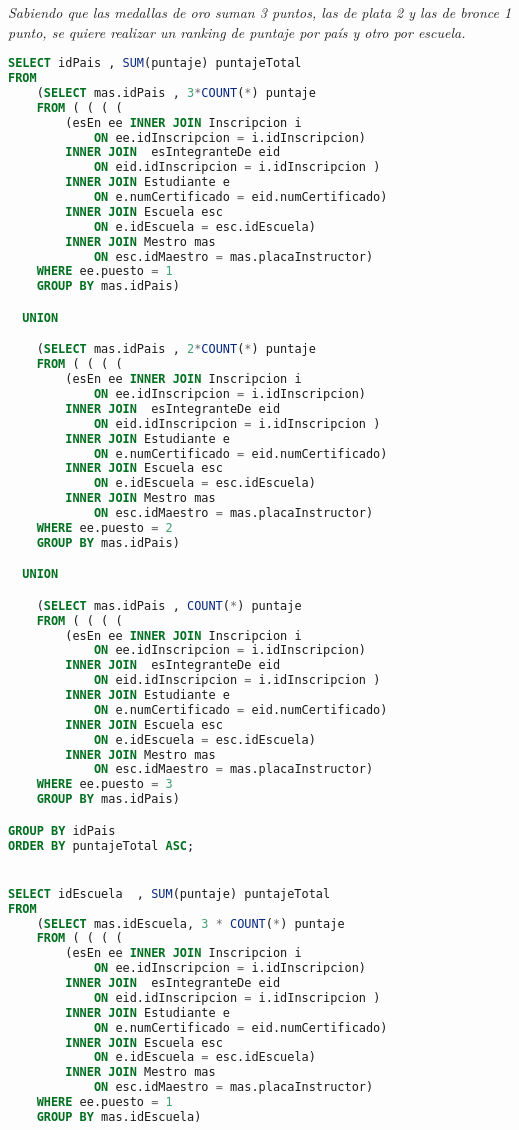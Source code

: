 \emph{Sabiendo que las medallas de oro suman 3 puntos, las de plata 2 y las de bronce 1 punto, se quiere realizar un ranking de puntaje por país y otro por escuela.}
\begin{lstlisting}[language=SQL]
SELECT idPais , SUM(puntaje) puntajeTotal
FROM
    (SELECT mas.idPais , 3*COUNT(*) puntaje
    FROM ( ( ( (
        (esEn ee INNER JOIN Inscripcion i
            ON ee.idInscripcion = i.idInscripcion)
        INNER JOIN  esIntegranteDe eid
            ON eid.idInscripcion = i.idInscripcion )
        INNER JOIN Estudiante e
            ON e.numCertificado = eid.numCertificado)
        INNER JOIN Escuela esc
            ON e.idEscuela = esc.idEscuela)
        INNER JOIN Mestro mas
            ON esc.idMaestro = mas.placaInstructor)
    WHERE ee.puesto = 1
    GROUP BY mas.idPais)

  UNION

    (SELECT mas.idPais , 2*COUNT(*) puntaje
    FROM ( ( ( (
        (esEn ee INNER JOIN Inscripcion i
            ON ee.idInscripcion = i.idInscripcion)
        INNER JOIN  esIntegranteDe eid
            ON eid.idInscripcion = i.idInscripcion )
        INNER JOIN Estudiante e
            ON e.numCertificado = eid.numCertificado)
        INNER JOIN Escuela esc
            ON e.idEscuela = esc.idEscuela)
        INNER JOIN Mestro mas
            ON esc.idMaestro = mas.placaInstructor)
    WHERE ee.puesto = 2
    GROUP BY mas.idPais)

  UNION

    (SELECT mas.idPais , COUNT(*) puntaje
    FROM ( ( ( (
        (esEn ee INNER JOIN Inscripcion i
            ON ee.idInscripcion = i.idInscripcion)
        INNER JOIN  esIntegranteDe eid
            ON eid.idInscripcion = i.idInscripcion )
        INNER JOIN Estudiante e
            ON e.numCertificado = eid.numCertificado)
        INNER JOIN Escuela esc
            ON e.idEscuela = esc.idEscuela)
        INNER JOIN Mestro mas
            ON esc.idMaestro = mas.placaInstructor)
    WHERE ee.puesto = 3
    GROUP BY mas.idPais)

GROUP BY idPais
ORDER BY puntajeTotal ASC;


SELECT idEscuela  , SUM(puntaje) puntajeTotal
FROM
    (SELECT mas.idEscuela, 3 * COUNT(*) puntaje
    FROM ( ( ( (
        (esEn ee INNER JOIN Inscripcion i
            ON ee.idInscripcion = i.idInscripcion)
        INNER JOIN  esIntegranteDe eid
            ON eid.idInscripcion = i.idInscripcion )
        INNER JOIN Estudiante e
            ON e.numCertificado = eid.numCertificado)
        INNER JOIN Escuela esc
            ON e.idEscuela = esc.idEscuela)
        INNER JOIN Mestro mas
            ON esc.idMaestro = mas.placaInstructor)
    WHERE ee.puesto = 1
    GROUP BY mas.idEscuela)


\end{lstlisting}
